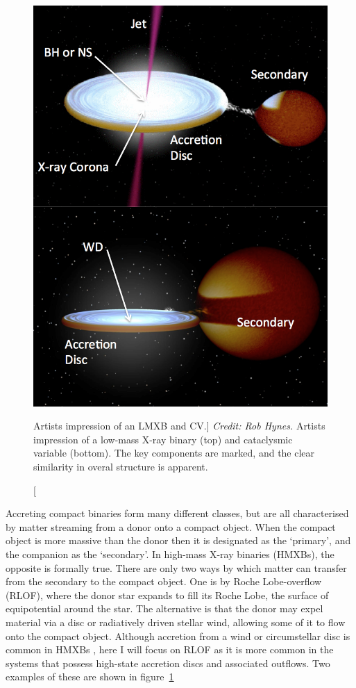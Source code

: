 \begin{figure}
\centering
\includegraphics[width=1.0\textwidth]{figures/01-intro/cv_and_xrb.png}
\caption
[Artists impression of an LMXB and CV.]
{
{\sl Credit: Rob Hynes.} 
Artists impression of a low-mass X-ray binary (top) and
cataclysmic variable (bottom). The key components are marked,
and the clear similarity in overal structure is apparent.
} 
\label{fig:cv_and_xrb}
\end{figure}

Accreting compact binaries form many different classes, 
but are all characterised by matter streaming from a donor
onto a compact object. When the compact object is more massive 
than the donor then it is designated as the `primary', 
and the companion as the `secondary'. 
In high-mass X-ray binaries (HMXBs), the opposite is formally true.
There are only two ways by which matter can transfer 
from the secondary to the compact object. One is by Roche Lobe-overflow (RLOF),
where the donor star expands to fill its Roche Lobe, the surface
of equipotential around the star. The alternative is that the donor may expel
material via a disc or radiatively driven stellar wind, 
allowing some of it to flow onto the compact object. 
Although accretion from a wind or circumstellar disc is common in 
HMXBs \citep{bartlett2013}, here I will focus on 
RLOF as it is more common in the systems that possess high-state accretion discs
and associated outflows. Two examples of these are shown in figure~\ref{fig:cv_and_xrb}



